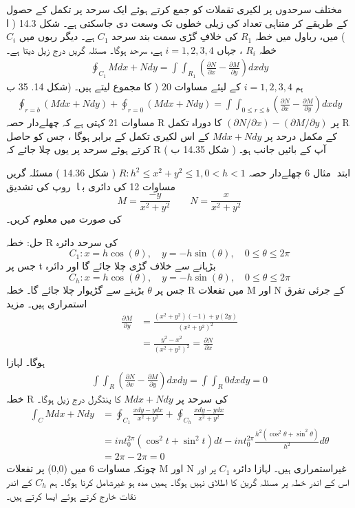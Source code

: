 \documentclass{book}
\begin{document}
\begin{urdufont}
مختلف سرحدوں پر لکیری تقملات کو جمع کرتے ہوئے ایک سرحد پر تکمل کے حصول کے طریقے کر متناہی تعداد کی زیلی خطوں تک وسعت دی جاسکتی ہے۔ شکل
14.3 ( ا )
میں، رباول میں خطہ
$R_1$
 کی خلافِ گڑی سمت بند سرحد
$C_1$
 ہے۔ دیگر ربوں میں 
 $C_i$
خطہ
$R_i$
، جہاں 
$i = 1, 2, 3, 4 $
ہے، سرحد ہوگا۔ مسئلہ گریں درج زیل دیتا ہے۔
\begin{align}
    \oint_{C_1} M dx + N dy = \int \int_{R_1} (\frac{\partial N}{\partial x} -  \frac{\partial M}{\partial y}) dx dy
\end{align}
ہم
$i= 1, 2, 3, 4$
کے لیئے  مساوات
20
( کا مجموع لیتے ہیں۔ (شکل 14. 35 ب
\begin{align}
    \oint_{r=b} (M dx + N dy) + \oint_{r=0} (M dx + N dy) = \int \int_{0\leq r \leq b} (\frac{\partial N}{\partial x} -  \frac{\partial M}{\partial y}) dx dy
\end{align}
مساوات 
21
کہتی ہے کہ چھلےدار حصہ 
R
پر 
$ (\partial N/\partial x) - (\partial M/\partial y) $
کا دوراہ تکمل 
R
کے مکمل درحد پر
$ M dx + N dy $
کے اس لکیری تکمل کے برابر ہوگا ، جس کو حاصل کرتے ہوئے سرحد پر یوں چلا جائے کہ 
R
آپ کے بائیں جانب ہو۔
( شکل 14.35 ب   )

ابتداؑ مثال 
6
چھلےدار حصہ 
$ R: h^2 \leq x^2 + y^2 \leq 1, 0<h<1 $
( شکل 14.36 )
مسئلہ گریں مساوات 
12
کی دائری بہاوؑ روپ کی تشدیق
$$ M = \frac{-y}{x^2 + y^2} \quad\quad N=\frac{x}{x^2 + y^2} $$
کی صورت میں معلوم کریں۔

حل: خطہ 
R
کی سرحد دائرہ
$$C_1 : x=h\cos{(\theta)},\quad  y= -h\sin{(\theta)},\quad 0\leq \theta \leq 2\pi$$
جس پر
t
 بڑہانے سے خلاف گڑی چلا جائے گا اور دائرہ
$$ C_h : x=h\cos{(\theta)},\quad  y= -h\sin{(\theta)},\quad 0\leq \theta \leq 2\pi $$
جس پر 
$\theta$
بڑہنے سے گڑیوار چلا جائے گا۔ خطہ
R
میں تفعلات
M
اور
N
کے جرئی تفرق استمراری ہیں۔ مزید
\begin{align*}
    \frac{\partial M}{\partial y} &= \frac{(x^2 + y^2)(-1) + y(2y)}{(x^2 + y^2)^2} \\
    &= \frac{y^2 - x^2}{(x^2 + y^2)^2} = \frac{\partial N}{\partial x}
\end{align*}
ہوگا۔ لہازا
\begin{align*}
    \int \int_R (\frac{\partial N}{\partial x} - \frac{\partial M}{\partial y}) dx dy = \int \int_R 0 dx dy =0 
\end{align*}
خطہ
R
کی سرحد پر 
$ M dx + N dy$
کا ینٹگرل درج زیل ہوگا۔
\begin{align*}
\int_C M dx + N dy &= \oint_{C_1} \frac{x dy - y dx}{x^2 + y^2} + \oint_{C_h}  \frac{x dy - y dx}{x^2 + y^2} \\
&= int_0^{2\pi} (\cos^2{t} + \sin^2{t}) dt - int_0^{2\pi} \frac{h^2 (\cos^2{\theta} + \sin^2{\theta})}{h^2} d\theta\\
&= 2\pi - 2\pi =0 
\end{align*}
چونکہ مساوات 
6
میں 
(0,0)
پر تفعلات
M
اور
N
غیراستمراری ہیں۔ لہازا دائرہ
$C_1$
پر اور اس کے اندر خطہ پر مسئلہ گرین کا اطلاق نہیں ہوگا۔ ہمیں مدہ ہو غیرشامل کرنا ہوگا۔ 
ہم 
$C_h$
کے اندر نقات خارج کرتے ہوئے ایسا کرتے ہیں۔


\end{urdufont}
\end{document}
